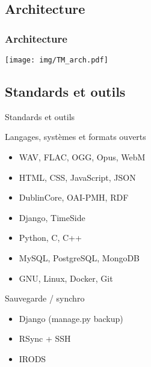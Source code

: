 \documentclass[final, hyperref, table]{beamer}
\begin{document}

\subsection{Architecture}
\begin{frame}\frametitle{Architecture}
  \begin{center}
    \texttt{[image: img/TM\_arch.pdf]}
  \end{center}
\end{frame}


\subsection{Standards et outils}
\begin{frame}{Standards et outils}
  \begin{block}{Langages, systèmes et formats ouverts}
    \begin{itemize}
    \item WAV, FLAC, OGG, Opus, WebM
    \item HTML, CSS, JavaScript, JSON
    \item DublinCore, OAI-PMH, RDF
    \item Django, TimeSide
    \item Python, C, C++
    \item MySQL, PostgreSQL, MongoDB
    \item GNU, Linux, Docker, Git
    \end{itemize}
    \end{block}

  \begin{block}{Sauvegarde / synchro}%
    \begin{itemize}
    \item Django (manage.py backup)
    \item RSync + SSH
    \item IRODS
    \end{itemize}
  \end{block}

\end{frame}
\end{document}
